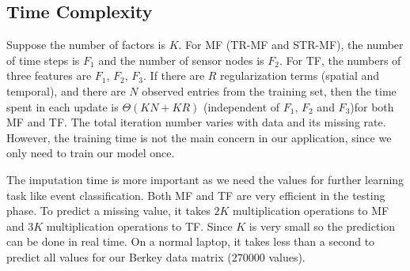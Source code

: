 \subsection{Time Complexity}
Suppose the number of factors is $K$.
For MF (TR-MF and STR-MF), the number of time steps is $F_1$ and the number of sensor nodes is $F_2$. 
For TF, the numbers of three features are $F_1$, $F_2$, $F_3$.  
If there are $R$ regularization terms (spatial and temporal), and there are $N$ observed entries from the training set, then the time spent in each update is $\Theta(KN + KR)$ (independent of $F_1$, $F_2$ and $F_3$)for both MF and TF. 
The total iteration number varies with data and its missing rate. 
However, the training time is not the main concern in our application, since we only need to train our model once.

The imputation time is more important as we need the values for further learning task like event classification.
Both MF and TF are very efficient in the testing phase.
To predict a missing value, it takes $2K$ multiplication operations to MF and $3K$ multiplication operations to TF.
Since $K$ is very small so the prediction can be done in real time.
On a normal laptop, it takes less than a second to predict all values for our Berkey data matrix ($270000$ values).

